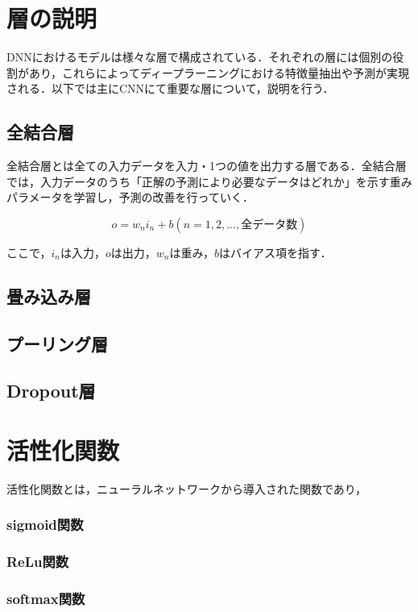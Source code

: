 \documentclass[a4j, 11pt]{jreport}
\begin{document}
\newpage
\section{層の説明}
DNNにおけるモデルは様々な層で構成されている．それぞれの層には個別の役割があり，これらによってディープラーニングにおける特徴量抽出や予測が実現される．以下では主にCNNにて重要な層について，説明を行う．
\subsection{全結合層}
全結合層とは全ての入力データを入力・1つの値を出力する層である．全結合層では，入力データのうち「正解の予測により必要なデータはどれか」を示す重みパラメータを学習し，予測の改善を行っていく．

\begin{equation}
 o = w_n i_n + b　(n = 1, 2, ... , 全データ数)
 \label{eq:affine}
\end{equation}

ここで，$i_n$は入力，$o$は出力，$w_n$は重み，$b$はバイアス項を指す．

\subsection{畳み込み層}

\subsection{プーリング層}
\subsection{Dropout層}

\section{活性化関数}
活性化関数とは，ニューラルネットワークから導入された関数であり，
\subsubsection{sigmoid関数}
\subsubsection{ReLu関数}
\subsubsection{softmax関数}
\end{document}
